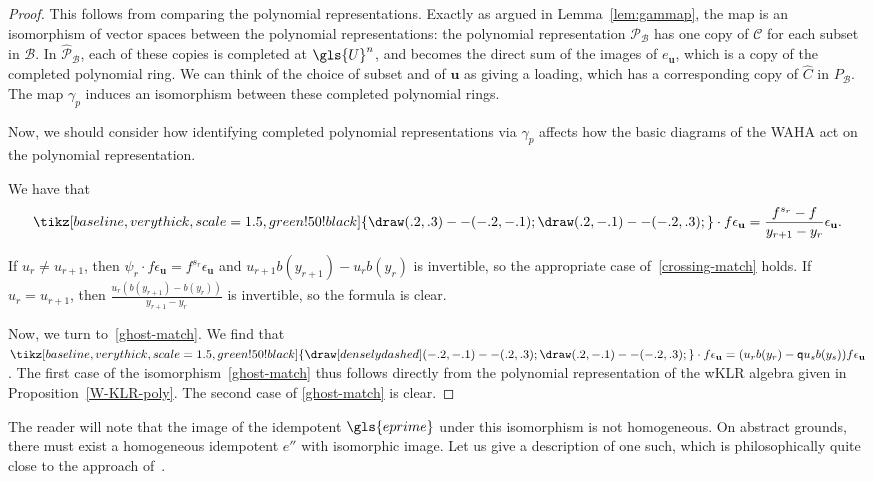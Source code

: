 \documentclass[ALCO,ThmDefs,Unicode,epreuves]{cedram}
\newcommand{\pq}{\mathsf{q}}
\newcommand{\Bu}{\mathbf{u}}
\newcommand{\cP}{\mathcal{P}}
\begin{document}
\begin{proof}
 This follows from comparing the polynomial representations. Exactly
 as argued in Lemma~\ref{lem:gammap}, the map is an isomorphism of
 vector spaces between the polynomial representations: the polynomial
 representation ${\cP}_{\mathscr{B}}$ has one copy of $\mathcal{C}$
 for each subset in $\mathscr{B}$. In $\widehat{\cP}_{\mathscr{B}}$,
 each of these copies is completed at $\gls{U}^n$, and becomes the direct
 sum of the images of $e_{\Bu}$, which is a copy of the completed
 polynomial ring. We can think of the choice of subset and of $\Bu$
 as giving a loading, which has a corresponding copy of $\widehat{C}$
 in $P_{\mathscr{B}}$. The map $\gamma_p$ induces an isomorphism
 between these completed polynomial rings.

 Now, we should
 consider how identifying completed polynomial representations via
 $\gamma_p$ affects how the basic diagrams of the WAHA act on the polynomial
 representation. 

 We have that \[\tikz[baseline,very thick,scale=1.5, green!50!black]{\draw (.2,.3) --
 (-.2,-.1); \draw
 (.2,-.1) -- (-.2,.3);} \cdot
f\epsilon_{\Bu}=\frac{f^{s_r}-f}{y_{r+1}-y_r}\epsilon_{\Bu}.
\]

If $u_r\neq u_{r+1}$, then $\psi_r\cdot
f\epsilon_\Bu=f^{s_r}\epsilon_\Bu$ and $u_{r+1}b(y_{r+1})-u_rb(y_r)$
is invertible, so the appropriate case of~\eqref{crossing-match} holds. If $u_r= u_{r+1}$, then
$\frac{u_{r}(b(y_{r+1})-b(y_r))}{y_{r+1}-y_r}$ is invertible, so the
formula is clear. 

Now, we turn to~\eqref{ghost-match}. We find that $\tikz[baseline,very thick,scale=1.5, green!50!black]{\draw[densely dashed] 
 (-.2,-.1)-- (.2,.3); \draw
 (.2,-.1) -- (-.2,.3);}\cdot f\epsilon_{\Bu}=(u_rb(y_r)-\pq u_sb(y_s) )f\epsilon_{\Bu}$. The first case of the isomorphism~\eqref{ghost-match} thus
follows directly from the polynomial representation of the wKLR algebra
given in Proposition~\ref{W-KLR-poly}. The second case of
\eqref{ghost-match} is clear.
\end{proof}





 The reader will note that the image of the idempotent $\gls{eprime}$ under
 this isomorphism is not homogeneous. On abstract grounds, there
 must exist a homogeneous idempotent $e''$ with isomorphic image. Let
 us give a description of one such, which is philosophically quite
 close to the approach of~\cite{SWschur}. 
\end{document}
